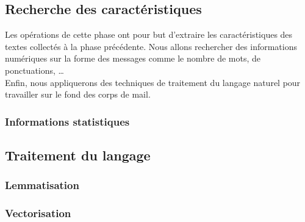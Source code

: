 \subsection{Recherche des caractéristiques}
Les opérations de cette phase ont pour but d'extraire les caractéristiques des textes collectés à la phase précédente.
Nous allons rechercher des informations numériques sur la forme des messages comme le nombre de mots, de ponctuations, \ldots\\
Enfin, nous appliquerons des techniques de traitement du langage naturel pour travailler sur le fond des corps de mail.

\subsubsection{Informations statistiques}

\subsection{Traitement du langage}
    \subsubsection{Lemmatisation}
	\subsubsection{Vectorisation}
